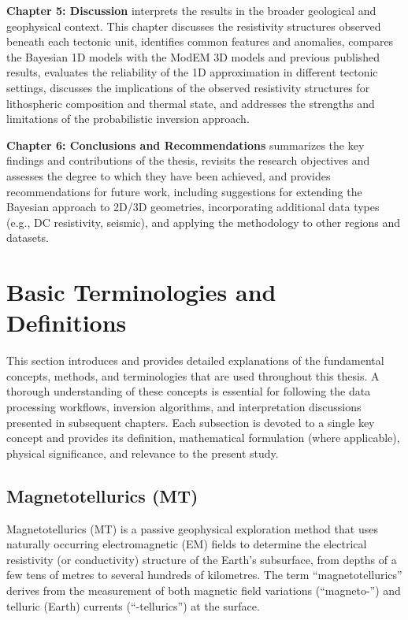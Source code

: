 \textbf{Chapter 5: Discussion} interprets the results in the broader geological and geophysical context. This chapter discusses the resistivity structures observed beneath each tectonic unit, identifies common features and anomalies, compares the Bayesian 1D models with the ModEM 3D models and previous published results, evaluates the reliability of the 1D approximation in different tectonic settings, discusses the implications of the observed resistivity structures for lithospheric composition and thermal state, and addresses the strengths and limitations of the probabilistic inversion approach.

\textbf{Chapter 6: Conclusions and Recommendations} summarizes the key findings and contributions of the thesis, revisits the research objectives and assesses the degree to which they have been achieved, and provides recommendations for future work, including suggestions for extending the Bayesian approach to 2D/3D geometries, incorporating additional data types (e.g., DC resistivity, seismic), and applying the methodology to other regions and datasets.


\section{Basic Terminologies and Definitions}

This section introduces and provides detailed explanations of the fundamental concepts, methods, and terminologies that are used throughout this thesis. A thorough understanding of these concepts is essential for following the data processing workflows, inversion algorithms, and interpretation discussions presented in subsequent chapters. Each subsection is devoted to a single key concept and provides its definition, mathematical formulation (where applicable), physical significance, and relevance to the present study.

\subsection{Magnetotellurics (MT)}

Magnetotellurics (MT) is a passive geophysical exploration method that uses naturally occurring electromagnetic (EM) fields to determine the electrical resistivity (or conductivity) structure of the Earth's subsurface, from depths of a few tens of metres to several hundreds of kilometres. The term ``magnetotellurics'' derives from the measurement of both magnetic field variations (``magneto-'') and telluric (Earth) currents (``-tellurics'') at the surface.

